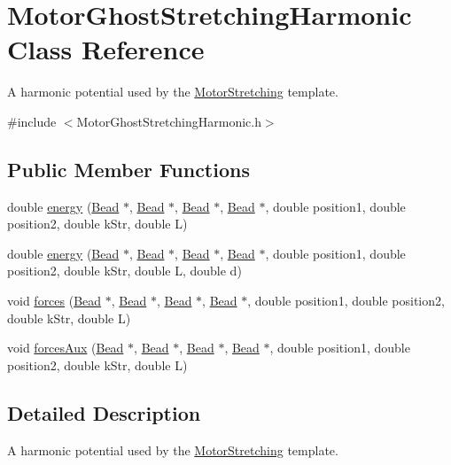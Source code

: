 \hypertarget{classMotorGhostStretchingHarmonic}{\section{Motor\+Ghost\+Stretching\+Harmonic Class Reference}
\label{classMotorGhostStretchingHarmonic}
}


A harmonic potential used by the \hyperlink{classMotorGhostStretching}{Motor\+Stretching} template.  




{\ttfamily \#include $<$Motor\+Ghost\+Stretching\+Harmonic.\+h$>$}

\subsection*{Public Member Functions}
\begin{DoxyCompactItemize}
\item 
double \hyperlink{classMotorGhostStretchingHarmonic_a61ddf9b84ab132104cbb17262a6f254c}{energy} (\hyperlink{classBead}{Bead} $\ast$, \hyperlink{classBead}{Bead} $\ast$, \hyperlink{classBead}{Bead} $\ast$, \hyperlink{classBead}{Bead} $\ast$, double position1, double position2, double k\+Str, double L)
\item 
double \hyperlink{classMotorGhostStretchingHarmonic_a1cf12c1c053fe1b4e2de5f497f727063}{energy} (\hyperlink{classBead}{Bead} $\ast$, \hyperlink{classBead}{Bead} $\ast$, \hyperlink{classBead}{Bead} $\ast$, \hyperlink{classBead}{Bead} $\ast$, double position1, double position2, double k\+Str, double L, double d)
\item 
void \hyperlink{classMotorGhostStretchingHarmonic_a473690f82dac6d091f9118934cc906b7}{forces} (\hyperlink{classBead}{Bead} $\ast$, \hyperlink{classBead}{Bead} $\ast$, \hyperlink{classBead}{Bead} $\ast$, \hyperlink{classBead}{Bead} $\ast$, double position1, double position2, double k\+Str, double L)
\item 
void \hyperlink{classMotorGhostStretchingHarmonic_ac85579b270d57fc8b67c34870b1bcc44}{forces\+Aux} (\hyperlink{classBead}{Bead} $\ast$, \hyperlink{classBead}{Bead} $\ast$, \hyperlink{classBead}{Bead} $\ast$, \hyperlink{classBead}{Bead} $\ast$, double position1, double position2, double k\+Str, double L)
\end{DoxyCompactItemize}


\subsection{Detailed Description}
A harmonic potential used by the \hyperlink{classMotorGhostStretching}{Motor\+Stretching} template. 

